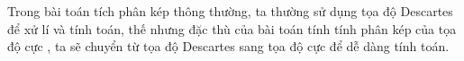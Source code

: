 \documentclass[preview]{standalone}
\begin{document}
\begin{center}
Trong bài toán tích phân kép thông thường, ta thường sử dụng tọa độ Descartes để xử lí và tính toán, thế nhưng đặc thù của bài toán tính tính phân kép của tọa độ cực , ta sẽ chuyển từ tọa độ Descartes sang tọa độ cực để dễ dàng tính toán.
\end{center}
\end{document}
